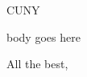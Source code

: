 \documentclass{letter}
\newcommand{\BODY}[1]{ body goes here #1 }
\begin{document}
	\begin{letter}
		{CUNY}

		\opening{} \BODY \closing{All the best,}
	\end{letter}
\end{document}
